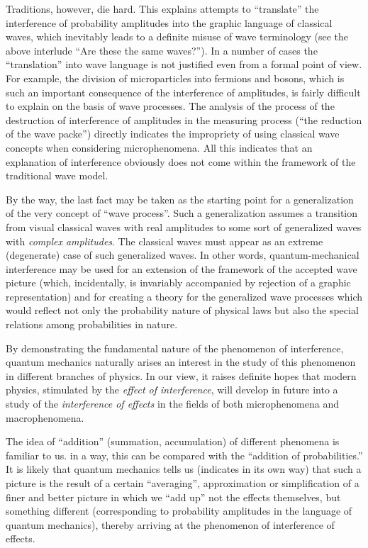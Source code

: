 \documentclass[a4paper,sfsidenotes,colorlinks=true]{tufte-book}
\numberwithin{equation}{section}
\numberwithin{figure}{section}
\begin{document}
Traditions, however, die hard. This explains attempts to ``translate''
the interference of probability amplitudes into the graphic language
of classical waves, which inevitably leads to a definite misuse of
wave terminology (see the above interlude ``Are these the same
waves?''). In a number of cases the ``translation'' into wave language is
not justified even from a formal point of view. For example, the
division of microparticles into fermions and bosons, which is such an
important consequence of the interference of amplitudes, is fairly
difficult to explain on the basis of wave processes. The analysis of
the process of the destruction of interference of amplitudes in the
measuring process (``the reduction of the wave packe'') directly
indicates the impropriety of using classical wave concepts when
considering microphenomena. All this indicates that an explanation of
interference obviously does not come within the framework of the
traditional wave model.


By the way, the last fact may be taken as the starting point for a
generalization of the very concept of ``wave process''. Such a
generalization assumes a transition from visual classical waves with
real amplitudes to some sort of generalized waves with \emph{complex
  amplitudes}. The classical waves must appear as an extreme
(degenerate) case of such generalized waves. In other words,
quantum-mechanical interference may be used for an extension of the
framework of the accepted wave picture (which, incidentally, is
invariably accompanied by rejection of a graphic representation) and
for creating a theory for the generalized wave processes which would
reflect not only the probability nature of physical laws but also the
special relations among probabilities in nature.


By demonstrating the fundamental nature of the phenomenon of
interference, quantum mechanics naturally arises an interest in the
study of this phenomenon in different branches of physics. In our
view, it raises definite hopes that modern physics, stimulated by the
\emph{effect of interference}, will develop in future into a study of the
\emph{interference of effects} in the fields of both microphenomena and
macrophenomena.


The idea of ``addition'' (summation, accumulation) of different
phenomena is familiar to us. in a way, this can be compared with the
``addition of probabilities.'' It is likely that quantum mechanics
tells us (indicates in its own way) that such a picture is the result
of a certain ``averaging'', approximation or simplification of a finer
and better picture in which we ``add up'' not the effects themselves,
but something different (corresponding to probability amplitudes in
the language of quantum mechanics), thereby arriving at the phenomenon
of interference of effects.
\end{document}
